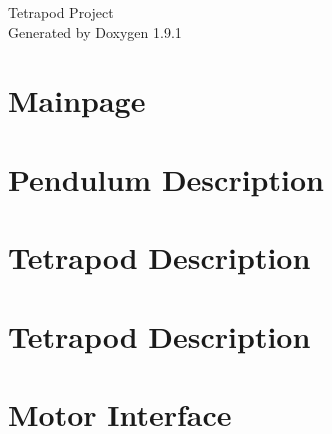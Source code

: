 \let\mypdfximage\pdfximage\def\pdfximage{\immediate\mypdfximage}\documentclass[twoside]{book}
\newcommand{\+}{\discretionary{\mbox{\scriptsize$\hookleftarrow$}}{}{}}
\newcommand{\clearemptydoublepage}{%
  \newpage{\pagestyle{empty}\cleardoublepage}%
}
\begin{document}
\raggedbottom

\hypersetup{pageanchor=false,
             bookmarksnumbered=true,
             pdfencoding=unicode
            }
\begin{titlepage}
\vspace*{7cm}
\begin{center}%
{\Large Tetrapod Project }\\
\vspace*{1cm}
{\large Generated by Doxygen 1.9.1}\\
\end{center}
\end{titlepage}
\clearemptydoublepage
{}
\tableofcontents
\clearemptydoublepage
{}
\hypersetup{pageanchor=true}

\chapter{Mainpage}
\label{index}\hypertarget{index}{}
\chapter{Pendulum Description}
\label{md_catkin_ws_src_simulator_pendulum_description_README}

\chapter{Tetrapod Description}
\label{md_catkin_ws_src_simulator_single_leg_description_README}

\chapter{Tetrapod Description}
\label{md_catkin_ws_src_simulator_tetrapod_description_README}

\chapter{Motor Interface}
\label{md_Arduino_libraries_motor_driver_README}

\end{document}

